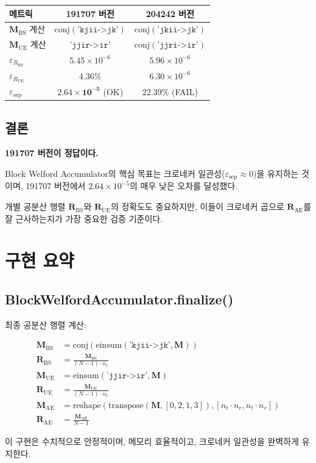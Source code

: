 \documentclass[10pt]{article}
\begin{document}
\begin{table}[h]
\centering
\begin{tabular}{lcc}
\hline
\textbf{메트릭} & \textbf{191707 버전} & \textbf{204242 버전} \\
\hline
$\mathbf{M}_{\text{BS}}$ 계산 & $\text{conj}(\texttt{'kjii->jk'})$ & $\text{conj}(\texttt{'jkii->jk'})$ \\
$\mathbf{M}_{\text{UE}}$ 계산 & $\texttt{'jjir->ir'}$ & $\text{conj}(\texttt{'jjri->ir'})$ \\
\hline
$\varepsilon_{R_{\text{BS}}}$ & $5.45 \times 10^{-6}$ & $5.96 \times 10^{-6}$ \\
$\varepsilon_{R_{\text{UE}}}$ & $4.36\%$ & $6.30 \times 10^{-6}$ \\
$\varepsilon_{\text{sep}}$ & $\mathbf{2.64 \times 10^{-5}}$ (OK) & $22.39\%$ (FAIL) \\
\hline
\end{tabular}
\end{table}

\subsection{결론}

\textbf{191707 버전이 정답이다.}

Block Welford Accumulator의 핵심 목표는 크로네커 일관성($\varepsilon_{\text{sep}} \approx 0$)을 유지하는 것이며, 191707 버전에서 $2.64 \times 10^{-5}$의 매우 낮은 오차를 달성했다.

개별 공분산 행렬 $\mathbf{R}_{\text{BS}}$와 $\mathbf{R}_{\text{UE}}$의 정확도도 중요하지만, 이들이 크로네커 곱으로 $\mathbf{R}_{\text{AE}}$를 잘 근사하는지가 가장 중요한 검증 기준이다.

\section{구현 요약}

\subsection{BlockWelfordAccumulator.finalize()}

최종 공분산 행렬 계산:

\begin{align}
\mathbf{M}_{\text{BS}} &= \text{conj}\left(\text{einsum}(\texttt{'kjii->jk'}, \mathbf{M})\right) \\
\mathbf{R}_{\text{BS}} &= \frac{\mathbf{M}_{\text{BS}}}{(N-1) \cdot n_r} \\[1em]
\mathbf{M}_{\text{UE}} &= \text{einsum}(\texttt{'jjir->ir'}, \mathbf{M}) \\
\mathbf{R}_{\text{UE}} &= \frac{\mathbf{M}_{\text{UE}}}{(N-1) \cdot n_t} \\[1em]
\mathbf{M}_{\text{AE}} &= \text{reshape}\left(\text{transpose}(\mathbf{M}, [0,2,1,3]), [n_t \cdot n_r, n_t \cdot n_r]\right) \\
\mathbf{R}_{\text{AE}} &= \frac{\mathbf{M}_{\text{AE}}}{N-1}
\end{align}

이 구현은 수치적으로 안정적이며, 메모리 효율적이고, 크로네커 일관성을 완벽하게 유지한다.
\end{document}
